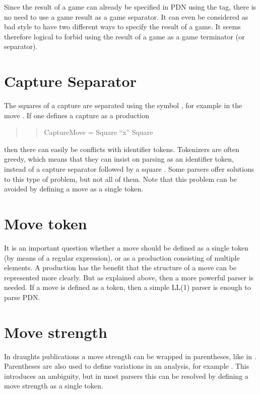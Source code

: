 \documentclass[letterpaper,10pt,english]{sphinxmanual}
\begin{document}
\sphinxAtStartPar
Since the result of a game can already be specified in PDN using the  tag, there
is no need to use a game result as a game separator. It can even be considered as bad style
to have two different ways to specify the result of a game. It seems therefore logical to
forbid using the result of a game as a game terminator (or separator).


\section{Capture Separator}
\label{\detokenize{issues:capture-separator}}
\sphinxAtStartPar
The squares of a capture are separated using the symbol , for example in the
move . If one defines a capture as a production
\begin{quote}
\begin{quote}

\sphinxAtStartPar
CaptureMove = Square “x” Square
\end{quote}
\end{quote}

\sphinxAtStartPar
then there can easily be conflicts with identifier tokens. Tokenizers are often greedy,
which means that they can insist on parsing  as an identifier token, instead
of a capture separator  followed by a square . Some parsers offer solutions to
this type of problem, but not all of them. Note that this problem can be avoided by defining
a move as a single token.


\section{Move token}
\label{\detokenize{issues:move-token}}
\sphinxAtStartPar
It is an important question whether a move should be defined as a single token (by means of
a regular expression), or as a production consisting of multiple elements. A production has
the benefit that the structure of a move can be represented more clearly. But as explained
above, then a more powerful parser is needed. If a move is defined as a token, then a
simple LL(1) parser is enough to parse PDN.


\section{Move strength}
\label{\detokenize{issues:move-strength}}
\sphinxAtStartPar
In draughts publications a move strength can be wrapped in parentheses, like in .
Parentheses are also used to define variations in an analysis, for example
. This introduces an ambiguity, but in
most parsers this can be resolved by defining a move strength as a single token.
\end{document}
